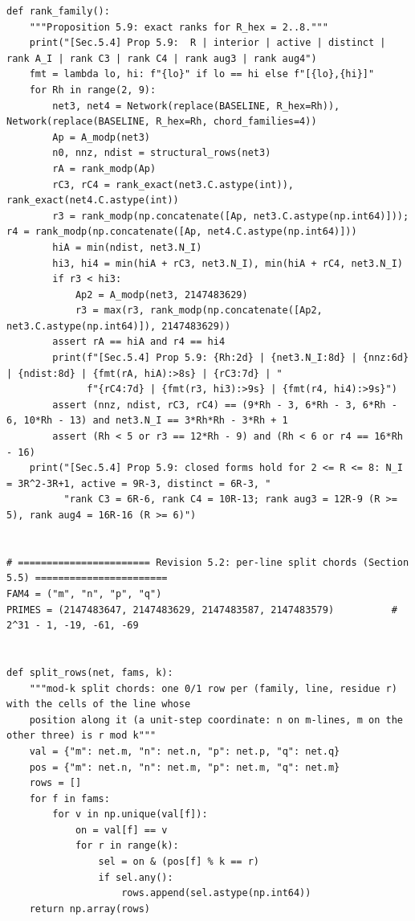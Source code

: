 \documentclass[11pt,a4paper]{article}
\theoremstyle{definition}
\theoremstyle{remark}
\begin{document}
\begin{lstlisting}
def rank_family():
    """Proposition 5.9: exact ranks for R_hex = 2..8."""
    print("[Sec.5.4] Prop 5.9:  R | interior | active | distinct | rank A_I | rank C3 | rank C4 | rank aug3 | rank aug4")
    fmt = lambda lo, hi: f"{lo}" if lo == hi else f"[{lo},{hi}]"
    for Rh in range(2, 9):
        net3, net4 = Network(replace(BASELINE, R_hex=Rh)), Network(replace(BASELINE, R_hex=Rh, chord_families=4))
        Ap = A_modp(net3)
        n0, nnz, ndist = structural_rows(net3)
        rA = rank_modp(Ap)
        rC3, rC4 = rank_exact(net3.C.astype(int)), rank_exact(net4.C.astype(int))
        r3 = rank_modp(np.concatenate([Ap, net3.C.astype(np.int64)])); r4 = rank_modp(np.concatenate([Ap, net4.C.astype(np.int64)]))
        hiA = min(ndist, net3.N_I)
        hi3, hi4 = min(hiA + rC3, net3.N_I), min(hiA + rC4, net3.N_I)
        if r3 < hi3:
            Ap2 = A_modp(net3, 2147483629)
            r3 = max(r3, rank_modp(np.concatenate([Ap2, net3.C.astype(np.int64)]), 2147483629))
        assert rA == hiA and r4 == hi4
        print(f"[Sec.5.4] Prop 5.9: {Rh:2d} | {net3.N_I:8d} | {nnz:6d} | {ndist:8d} | {fmt(rA, hiA):>8s} | {rC3:7d} | "
              f"{rC4:7d} | {fmt(r3, hi3):>9s} | {fmt(r4, hi4):>9s}")
        assert (nnz, ndist, rC3, rC4) == (9*Rh - 3, 6*Rh - 3, 6*Rh - 6, 10*Rh - 13) and net3.N_I == 3*Rh*Rh - 3*Rh + 1
        assert (Rh < 5 or r3 == 12*Rh - 9) and (Rh < 6 or r4 == 16*Rh - 16)
    print("[Sec.5.4] Prop 5.9: closed forms hold for 2 <= R <= 8: N_I = 3R^2-3R+1, active = 9R-3, distinct = 6R-3, "
          "rank C3 = 6R-6, rank C4 = 10R-13; rank aug3 = 12R-9 (R >= 5), rank aug4 = 16R-16 (R >= 6)")


# ======================= Revision 5.2: per-line split chords (Section 5.5) =======================
FAM4 = ("m", "n", "p", "q")
PRIMES = (2147483647, 2147483629, 2147483587, 2147483579)          # 2^31 - 1, -19, -61, -69


def split_rows(net, fams, k):
    """mod-k split chords: one 0/1 row per (family, line, residue r) with the cells of the line whose
    position along it (a unit-step coordinate: n on m-lines, m on the other three) is r mod k"""
    val = {"m": net.m, "n": net.n, "p": net.p, "q": net.q}
    pos = {"m": net.n, "n": net.m, "p": net.m, "q": net.m}
    rows = []
    for f in fams:
        for v in np.unique(val[f]):
            on = val[f] == v
            for r in range(k):
                sel = on & (pos[f] % k == r)
                if sel.any():
                    rows.append(sel.astype(np.int64))
    return np.array(rows)



\end{lstlisting}
\end{document}
